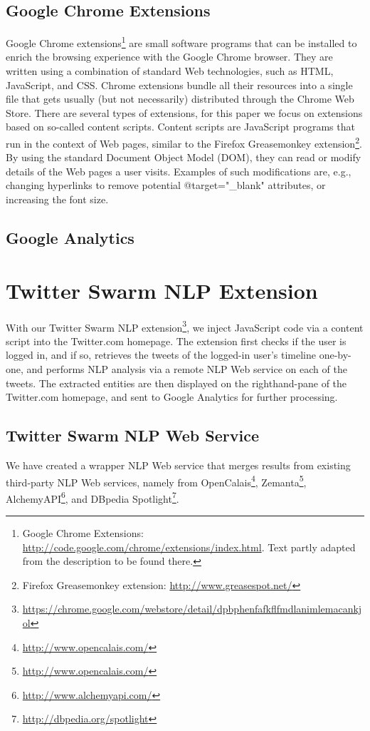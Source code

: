 \documentclass[runningheads,a4paper]{llncs}
\begin{document}
\subsection{Google Chrome Extensions}
Google Chrome extensions\footnote{Google Chrome Extensions: \url{http://code.google.com/chrome/extensions/index.html}. Text partly adapted from the description to be found there.} are small software programs that can be installed to enrich the browsing experience with the Google Chrome browser. They are written using a combination of standard Web technologies, such as HTML, JavaScript, and CSS. Chrome extensions bundle all their resources into a single file that gets usually (but not necessarily) distributed through the Chrome Web Store. There are several types of extensions, for this paper we focus on extensions based on so-called content scripts. Content scripts are JavaScript programs that run in the context of Web pages, similar to the Firefox Greasemonkey extension\footnote{Firefox Greasemonkey extension: \url{http://www.greasespot.net/}}. By using the standard Document Object Model (DOM), they can read or modify details of the Web pages a user visits. Examples of such modifications are, e.g., changing hyperlinks to remove potential @target="\_blank" attributes, or increasing the font size.

\subsection{Google Analytics}
 
\section{Twitter Swarm NLP Extension}
With our Twitter Swarm NLP extension\footnote{\url{https://chrome.google.com/webstore/detail/dpbphenfafkflfmdlanimlemacankjol}}, we inject JavaScript code via a content script into the Twitter.com homepage. The extension first checks if the user is logged in, and if so, retrieves the tweets of the logged-in user's timeline one-by-one, and performs NLP analysis via a remote NLP Web service on each of the tweets. The extracted entities are then displayed on the righthand-pane of the Twitter.com homepage, and sent to Google Analytics for further processing.

\subsection{Twitter Swarm NLP Web Service}
We have created a wrapper NLP Web service that merges results from existing third-party NLP Web services, namely from OpenCalais\footnote{\url{http://www.opencalais.com/}}, Zemanta\footnote{\url{http://www.opencalais.com/}}, AlchemyAPI\footnote{\url{http://www.alchemyapi.com/}}, and DBpedia Spotlight\footnote{\url{http://dbpedia.org/spotlight}}.
\end{document}
